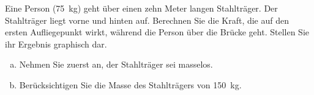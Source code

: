 \begin{aufgabe}
	Eine Person (\SI{75}{kg}) geht über einen zehn Meter langen Stahlträger. Der Stahlträger liegt vorne und hinten auf.
Berechnen Sie die Kraft, die auf den ersten Aufliegepunkt wirkt, während die Person über die Brücke geht.
Stellen Sie ihr Ergebnis graphisch dar.
\begin{enumerate} [a)]
	\item Nehmen Sie zuerst an, der Stahlträger sei masselos.
	\item Berücksichtigen Sie die Masse des Stahlträgers von \SI{150}{kg}.
\end{enumerate}
\end{aufgabe}
